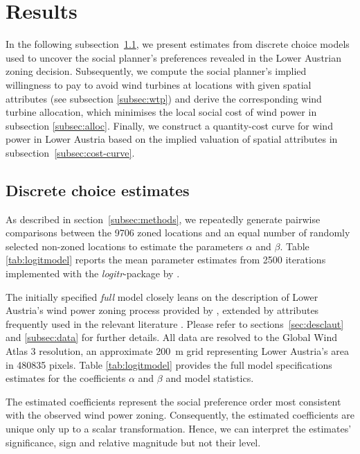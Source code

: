 \documentclass[review, a4paper, 12pt, authoryear, times]{elsarticle}
\begin{document}
\section{Results} \label{sec:results}
In the following subsection~\ref{subsec:estimates}, we present estimates from discrete choice models used to uncover the social planner's preferences revealed in the Lower Austrian zoning decision. 
Subsequently, we compute the social planner's implied willingness to pay to avoid wind turbines at locations with given spatial attributes (see subsection \ref{subsec:wtp}) and derive the corresponding wind turbine allocation, which minimises the local social cost of wind power in subsection \ref{subsec:alloc}.
Finally, we construct a quantity-cost curve for wind power in Lower Austria based on the implied valuation of spatial attributes in subsection~\ref{subsec:cost-curve}.

\subsection{Discrete choice estimates} \label{subsec:estimates}
As described in section~\ref{subsec:methods}, we repeatedly generate pairwise comparisons between the \num{9706} zoned locations and an equal number of randomly selected non-zoned locations to estimate the parameters $\alpha$ and $\beta$.
Table \ref{tab:logitmodel} reports the mean parameter estimates from \num{2500} iterations implemented with the \emph{logitr}-package by \cite{Helveston2023}.



The initially specified \emph{full} model closely leans on the description of Lower Austria's wind power zoning process provided by \cite{Knoll2014}, extended by attributes frequently used in the relevant literature \citep[see][for a review]{McKenna2022}.
Please refer to sections~\ref{sec:desclaut} and \ref{subsec:data} for further details.
All data are resolved to the Global Wind Atlas 3 resolution, an approximate \SI{200}{\metre} grid representing Lower Austria's area in \num{480835} pixels.
Table \ref{tab:logitmodel} provides the full model specifications estimates for the coefficients $\alpha$ and $\beta$ and model statistics.

The estimated coefficients represent the social preference order most consistent with the observed wind power zoning.
Consequently, the estimated coefficients are unique only up to a scalar transformation.
Hence, we can interpret the estimates' significance, sign and relative magnitude but not their level.
\end{document}
